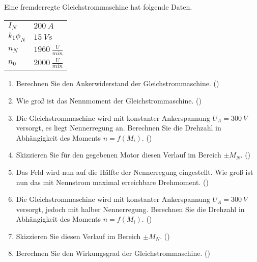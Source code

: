 \begin{question}[topic=gsm,name={24.7.2013},type=exam,tags={20130724}]
Eine fremderregte Gleichstrommaschine hat folgende Daten.\\
\begin{tabular}{L{2cm}l}
$I_{N}$ \dotfill &$200~A$\\
$k_1 \phi_N$ \dotfill & $15~Vs$ \\
$n_N$ \dotfill & $1960~\frac{U}{min}$\\
$n_0$ \dotfill & $2000~\frac{U}{min}$
\end{tabular}
\begin{enumerate}
\item Berechnen Sie den Ankerwiderstand der Gleichstrommaschine. ()
\item Wie groß ist das Nennmoment der Gleichstrommaschine. ()
\item Die Gleichstrommaschine wird mit konstanter Ankerspannung $U_A = 300~V$ versorgt, es liegt Nennerregung an. Berechnen Sie die Drehzahl in Abhängigkeit des Moments $n=f(M_i)$. ()
\item Skizzieren Sie für den gegebenen Motor diesen Verlauf im Bereich $\pm M_N$. ()
\item Das Feld wird nun auf die Hälfte der Nennerregung eingestellt. Wie groß ist nun das mit Nennstrom maximal erreichbare Drehmoment. ()
\item Die Gleichstrommaschine wird mit konstanter Ankerspannung $U_A = 300~V$ versorgt, jedoch mit halber Nennerregung. Berechnen Sie die Drehzahl in Abhängigkeit des Moments $n=f(M_i)$. ()
\item Skizzieren Sie diesen Verlauf im Bereich $\pm M_N$. ()
\item Berechnen Sie den Wirkungsgrad der Gleichstrommaschine. ()
\end{enumerate}
\end{question}

